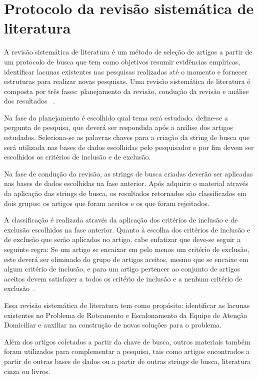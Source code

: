 { }%

\section{Protocolo da revisão sistemática de literatura}

A revisão sistemática de literatura é um método de seleção de artigos a partir de um protocolo de busca que tem como objetivos resumir evidências empíricas, identificar lacunas existentes nas pesquisas realizadas até o momento e fornecer estruturas para realizar novas pesquisas. Uma revisão sistemática de literatura é composta por três fases: planejamento da revisão, condução da revisão e análise dos resultados~ \cite{Kitchenham:2007} .

Na fase do planejamento é escolhido qual tema será estudado. define-se a pergunta de pesquisa, que deverá ser respondida após a análise dos artigos estudados. Seleciona-se as palavras chaves para a criação da string de busca que será utilizada nas bases de dados escolhidas pelo pesquisador e por fim devem ser escolhidos os critérios de inclusão e de exclusão.

Na fase de condução da revisão, as strings de busca criadas deverão ser aplicadas nas bases de dados escolhidas na fase anterior.
Após adquirir o material através da aplicação das strings de busca, os resultados retornados são classificados em dois grupos: os artigos que foram aceitos e os que foram rejeitados.

A classificação é realizada através da aplicação dos critérios de inclusão e de exclusão escolhidos na fase anterior.
Quanto à escolha dos critérios de inclusão e de exclusão que serão aplicados no artigo, cabe enfatizar que deve-se seguir a  seguinte regra: Se um artigo se encaixar em pelo menos um critério de exclusão, este deverá ser eliminado do grupo de artigos aceitos, mesmo que se encaixe em algum critério de inclusão, e para um artigo pertencer ao conjunto de artigos aceitos devem satisfazer a todos os critério de inclusão e a nenhum critério de exclusão~\cite{Kitchenham:2007}. 

Essa revisão sistemática de literatura tem como propósito: identificar as lacunas existentes no Problema de Roteamento e Escalonamento da Equipe de Atenção Domiciliar e auxiliar na construção de novas soluções para o problema. 

Além dos artigos coletados a partir da chave de busca, outros materiais também foram utilizados para complementar a pesquisa, tais como artigos encontrados a partir de outras bases de dados ou a partir de outras strings de busca, literatura cinza ou livros.

